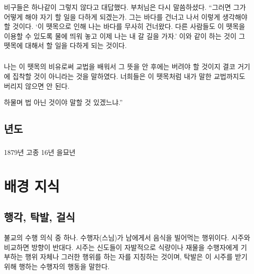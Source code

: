 \documentclass[12pt, a4paper, oneside]{book}
\let\stdsection\section
\renewcommand\section{\newpage\stdsection}
\begin{document}
비구들은 하나같이 그렇지 않다고 대답했다.
부처님은 다시 말씀하셨다.
“그러면 그가 어떻게 해야 자기 할 일을 다하게 되겠는가.
그는 바다를 건너고 나서 이렇게 생각해야 할 것이다.
‘이 뗏목으로 인해 나는 바다를 무사히 건너왔다.
다른 사람들도 이 뗏목을 이용할 수 있도록 물에 띄워 놓고 이제 나는 내 갈 길을 가자.’
이와 같이 하는 것이 그 뗏목에 대해서 할 일을 다하게 되는 것이다.

\paragraph{}
 나는 이 뗏목의 비유로써 교법을 배워서 그 뜻을 안 후에는 버려야 할 것이지 결코 거기에 집착할 것이 아니라는 것을 말하였다.
너희들은 이 뗏목처럼 내가 말한 교법까지도 버리지 않으면 안 된다.

 

하물며 법 아닌 것이야 말할 것 있겠느냐.”

%										
	\section{ 년도 }

\paragraph{} 
1879년 고종 16년 을묘년


%										
	\chapter{ 배경 지식}


%										
	\section{ 행각, 탁발, 걸식 }

불교의 수행 의식 중 하나. 수행자(스님)가 남에게서 음식을 빌어먹는 행위이다. 시주와 비교하면 방향이 반대다. 시주는 신도들이 자발적으로 식량이나 재물을 수행자에게 기부하는 행위 자체나 그러한 행위를 하는 자를 지칭하는 것이며, 탁발은 이 시주를 받기 위해 행하는 수행자의 행동을 말한다.
\end{document}
